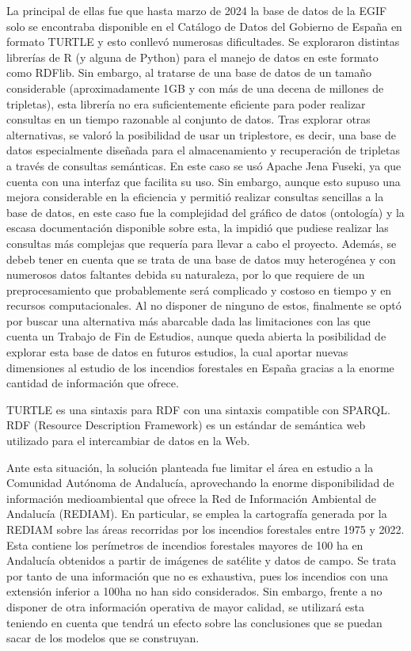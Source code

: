 \documentclass[12pt,a4paper,]{book}
\numberwithin{dummy}{section}
\theoremstyle{ocrenumbox}
\theoremstyle{blacknumex}
\theoremstyle{blacknumbox}
\theoremstyle{ocrenum}
\theoremstyle{ocrenum}
\begin{document}
La principal de ellas fue que hasta marzo de 2024 la base de datos de la
EGIF solo se encontraba disponible en el Catálogo de Datos del Gobierno
de España en formato TURTLE y esto conllevó numerosas dificultades. Se
exploraron distintas librerías de R (y alguna de Python) para el manejo
de datos en este formato como RDFlib. Sin embargo, al tratarse de una
base de datos de un tamaño considerable (aproximadamente 1GB y con más
de una decena de millones de tripletas), esta librería no era
suficientemente eficiente para poder realizar consultas en un tiempo
razonable al conjunto de datos. Tras explorar otras alternativas, se
valoró la posibilidad de usar un triplestore, es decir, una base de
datos especialmente diseñada para el almacenamiento y recuperación de
tripletas a través de consultas semánticas. En este caso se usó Apache
Jena Fuseki, ya que cuenta con una interfaz que facilita su uso. Sin
embargo, aunque esto supuso una mejora considerable en la eficiencia y
permitió realizar consultas sencillas a la base de datos, en este caso
fue la complejidad del gráfico de datos (ontología) y la escasa
documentación disponible sobre esta, la impidió que pudiese realizar las
consultas más complejas que requería para llevar a cabo el proyecto.
Además, se debeb tener en cuenta que se trata de una base de datos muy
heterogénea y con numerosos datos faltantes debida su naturaleza, por lo
que requiere de un preprocesamiento que probablemente será complicado y
costoso en tiempo y en recursos computacionales. Al no disponer de
ninguno de estos, finalmente se optó por buscar una alternativa más
abarcable dada las limitaciones con las que cuenta un Trabajo de Fin de
Estudios, aunque queda abierta la posibilidad de explorar esta base de
datos en futuros estudios, la cual aportar nuevas dimensiones al estudio
de los incendios forestales en España gracias a la enorme cantidad de
información que ofrece.

TURTLE es una sintaxis para RDF con una sintaxis compatible con SPARQL.
RDF (Resource Description Framework) es un estándar de semántica web
utilizado para el intercambiar de datos en la Web.

Ante esta situación, la solución planteada fue limitar el área en
estudio a la Comunidad Autónoma de Andalucía, aprovechando la enorme
disponibilidad de información medioambiental que ofrece la Red de
Información Ambiental de Andalucía (REDIAM). En particular, se emplea la
cartografía generada por la REDIAM sobre las áreas recorridas por los
incendios forestales entre 1975 y 2022. Esta contiene los perímetros de
incendios forestales mayores de 100 ha en Andalucía obtenidos a partir
de imágenes de satélite y datos de campo. Se trata por tanto de una
información que no es exhaustiva, pues los incendios con una extensión
inferior a 100ha no han sido considerados. Sin embargo, frente a no
disponer de otra información operativa de mayor calidad, se utilizará
esta teniendo en cuenta que tendrá un efecto sobre las conclusiones que
se puedan sacar de los modelos que se construyan.
\end{document}
